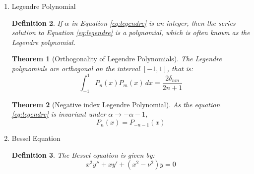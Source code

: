 \documentclass{article}
\newtheorem{definition}{Definition}[section]
\newtheorem{theorem}{Theorem}[section]
\begin{document}
\begin{enumerate}
\begin{definition}
              If $\alpha$ is not a integer, then both $y_{0,\alpha}(x)$, and $y_{1,\alpha}(x)$
              is an infinite series with a radius of convergence $1$.
          \end{definition}
    \item Legendre Polynomial
          \begin{definition}
              If $\alpha$ in Equation \ref{eq:legendre} is an integer,
              then the series solution to Equation \ref{eq:legendre} is a polynomial,
              which is often known as the Legendre polynomial.
          \end{definition}
          \begin{theorem} [Orthogonality of Legendre Polynomials]
              The Legendre polynomials are orthogonal on the interval $[-1, 1]$,
              that is:
              \begin{equation}
                  \int_{-1}^{1} P_{n}(x) P_{m}(x) \, dx = \frac{2\delta_{nm}}{2n+1}
              \end{equation}
          \end{theorem}
          \begin{theorem}[Negative index Legendre Polynomial]
              As the equation \ref{eq:legendre} is invariant under $\alpha \rightarrow -\alpha - 1$,
              \begin{equation}
                  P_{n} (x) = P_{-n-1}(x)
              \end{equation}
          \end{theorem}
    \item Bessel Equation
          \begin{definition}
              The Bessel equation is given by:
              \begin{equation}
                  x^2 y'' + x y' + (x^2 - \nu ^2) y = 0
              \end{equation}


\end{definition}
\end{enumerate}
\end{document}

